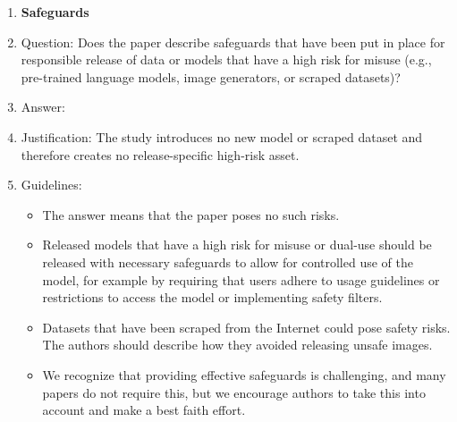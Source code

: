 \documentclass[
]{article}
\begin{document}
\begin{enumerate}
\item {\bf Safeguards}
    \item[] Question: Does the paper describe safeguards that have been put in place for responsible release of data or models that have a high risk for misuse (e.g., pre-trained language models, image generators, or scraped datasets)?
    \item[] Answer: \answerNA{} %
    \item[] Justification: The study introduces no new model or scraped dataset and therefore creates no release-specific high-risk asset.
    \item[] Guidelines:
    \begin{itemize}
        \item The answer \answerNA{} means that the paper poses no such risks.
        \item Released models that have a high risk for misuse or dual-use should be released with necessary safeguards to allow for controlled use of the model, for example by requiring that users adhere to usage guidelines or restrictions to access the model or implementing safety filters. 
        \item Datasets that have been scraped from the Internet could pose safety risks. The authors should describe how they avoided releasing unsafe images.
        \item We recognize that providing effective safeguards is challenging, and many papers do not require this, but we encourage authors to take this into account and make a best faith effort.
    \end{itemize}


\end{enumerate}
\end{document}
